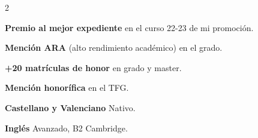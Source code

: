 \documentclass{miquelcv}
\begin{document}
\begin{paracol}{2}
\begin{cvlist}
  \item \textbf{Premio al mejor expediente} en el curso 22-23 de mi promoción.
  \item \textbf{Mención ARA} (alto rendimiento académico) en el grado. 
  \item \textbf{+20 matrículas de honor} en grado y master. 
  \item \textbf{Mención honorífica} en el TFG.
\end{cvlist}


{\small\textbf{Castellano y Valenciano}}\newline
{\small Nativo.}\par
\vspace{4pt}
{\small\textbf{Inglés}}\newline
{\small Avanzado, B2 Cambridge.}\par

\end{paracol}
\end{document}
